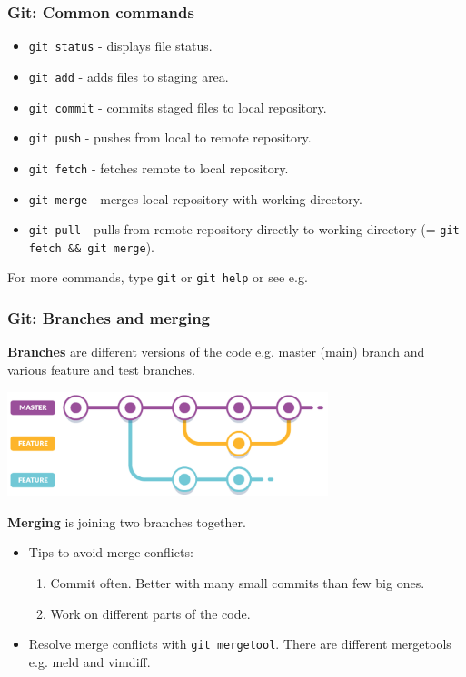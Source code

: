 \documentclass{fenicscourse}
\begin{document}
\begin{frame}
  \frametitle{Git: Common commands}

  \begin{itemize}
    \item \texttt{git status} - displays file status.
    \item \texttt{git add} - adds files to staging area.
    \item \texttt{git commit} - commits staged files to local repository.
    \item \texttt{git push} - pushes from local to remote repository.
    \item \texttt{git fetch} - fetches remote to local repository.
    \item \texttt{git merge} - merges local repository with working directory.
    \item \texttt{git pull} - pulls from remote repository directly to
      working directory (= \texttt{git fetch \&\& git merge}).
  \end{itemize}

  \bigskip

  For more commands, type \texttt{git} or \texttt{git help} or see e.g.
   \\
\end{frame}

\begin{frame}
  \frametitle{Git: Branches and merging}

  \textbf{Branches} are different versions of the code e.g. master (main)
  branch and various feature and test branches.

  \begin{center}
    \includegraphics[width=0.7\textwidth]{png/git_branches.png}
  \end{center}

  \textbf{Merging} is joining two branches together.

  \begin{itemize}
  \item  Tips to avoid merge conflicts:
    \begin{enumerate}
      \item Commit often. Better with many small commits than few big ones.
      \item Work on different parts of the code.
    \end{enumerate}
  \item Resolve merge conflicts with \texttt{git mergetool}. There are
    different mergetools e.g. meld and vimdiff.
  \end{itemize}
\end{frame}
\end{document}
